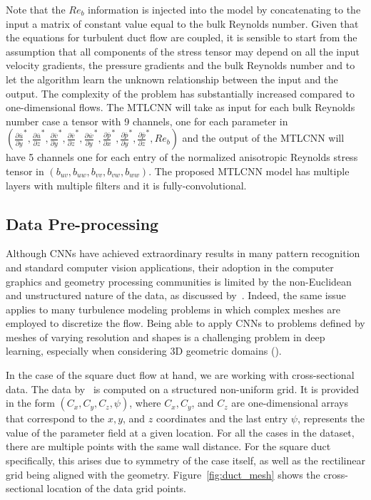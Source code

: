 \documentclass[11pt]{article}
\numberwithin{equation}{section}
\theoremstyle{plain}
\theoremstyle{definition}
\begin{document}
Note that the $Re_{b}$ information is injected into the model by concatenating to the input a matrix of constant value equal to the bulk Reynolds number. Given that the equations for turbulent duct flow are coupled, it is sensible to start from the assumption that all components of the stress tensor may depend on all the input velocity gradients, the pressure gradients and the bulk Reynolds number and to let the algorithm learn the unknown relationship between the input and the output. The complexity of the problem has substantially increased compared to one-dimensional flows. The MTLCNN will take as input for each bulk Reynolds number case a tensor with 9 channels, one for each parameter in $\left(\frac{\partial \overline{u}}{\partial y}^{*},\frac{\partial \overline{u}}{\partial z}^{*},\frac{\partial \overline{v}}{\partial y}^{*},\frac{\partial \overline{v}}{\partial z}^{*},\frac{\partial \overline{w}}{\partial y}^{*},\frac{\partial\overline{p}}{\partial x}^{*},\frac{\partial\overline{p}}{\partial y}^{*},\frac{\partial\overline{p}}{\partial z}^{*},Re_{b}\right)$ and the output of the MTLCNN will have 5 channels one for each entry of the normalized anisotropic Reynolds stress tensor in $\left(b_{uv},b_{uw},b_{vv},b_{vw},b_{ww}\right)$. The proposed MTLCNN model has multiple layers with multiple filters and it is fully-convolutional.


\subsection{Data Pre-processing}
\label{Data pre-processing}

Although CNNs have achieved extraordinary results in many pattern recognition and standard computer vision applications, their adoption in the computer graphics and geometry processing communities is limited by the non-Euclidean and unstructured nature of the data, as discussed by~\cite{NIPS2016_228499b5}. Indeed, the same issue applies to many turbulence modeling problems in which complex meshes are employed to discretize the flow. Being able to apply CNNs to problems defined by meshes of varying resolution and shapes is a challenging problem in deep learning, especially when considering 3D geometric domains (\cite{MasciBBV15,monti,Poulenard2018MultidirectionalGN}).

In the case of the square duct flow at hand, we are working with cross-sectional data. The data by~\cite{mcconkey2021curated} is computed on a structured non-uniform grid. It is provided in the form $(C_{x},C_{y},C_{z},\psi)$, where $C_{x}, C_{y}$, and $C_{z}$ are one-dimensional arrays that correspond to the $x,y$, and $z$ coordinates and the last entry $\psi$, represents the value of the parameter field at a given location. For all the cases in the dataset, there are multiple points with the same wall distance. For the square duct specifically, this arises due to symmetry of the case itself, as well as the rectilinear grid being aligned with the geometry. Figure~\ref{fig:duct_mesh} shows the cross-sectional location of the data grid points. 
\end{document}
